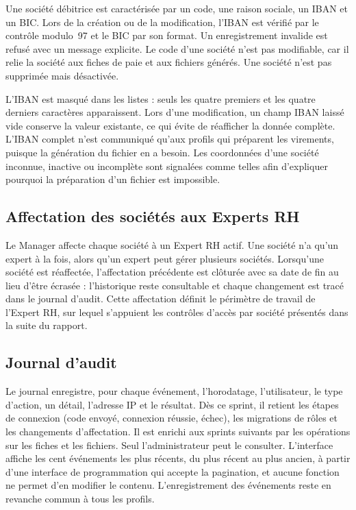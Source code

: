 Une société débitrice est caractérisée par un code, une raison sociale, un IBAN et un BIC. Lors de la création ou de la modification, l'IBAN est vérifié par le contrôle modulo~97 et le BIC par son format. Un enregistrement invalide est refusé avec un message explicite. Le code d'une société n'est pas modifiable, car il relie la société aux fiches de paie et aux fichiers générés. Une société n'est pas supprimée mais désactivée.

L'IBAN est masqué dans les listes : seuls les quatre premiers et les quatre derniers caractères apparaissent. Lors d'une modification, un champ IBAN laissé vide conserve la valeur existante, ce qui évite de réafficher la donnée complète. L'IBAN complet n'est communiqué qu'aux profils qui préparent les virements, puisque la génération du fichier en a besoin. Les coordonnées d'une société inconnue, inactive ou incomplète sont signalées comme telles afin d'expliquer pourquoi la préparation d'un fichier est impossible.

\subsection{Affectation des sociétés aux Experts RH}

Le Manager affecte chaque société à un Expert RH actif. Une société n'a qu'un expert à la fois, alors qu'un expert peut gérer plusieurs sociétés. Lorsqu'une société est réaffectée, l'affectation précédente est clôturée avec sa date de fin au lieu d'être écrasée : l'historique reste consultable et chaque changement est tracé dans le journal d'audit. Cette affectation définit le périmètre de travail de l'Expert RH, sur lequel s'appuient les contrôles d'accès par société présentés dans la suite du rapport.

\subsection{Journal d'audit}

Le journal enregistre, pour chaque événement, l'horodatage, l'utilisateur, le type d'action, un détail, l'adresse IP et le résultat. Dès ce sprint, il retient les étapes de connexion (code envoyé, connexion réussie, échec), les migrations de rôles et les changements d'affectation. Il est enrichi aux sprints suivants par les opérations sur les fiches et les fichiers. Seul l'administrateur peut le consulter. L'interface affiche les cent événements les plus récents, du plus récent au plus ancien, à partir d'une interface de programmation qui accepte la pagination, et aucune fonction ne permet d'en modifier le contenu. L'enregistrement des événements reste en revanche commun à tous les profils.

